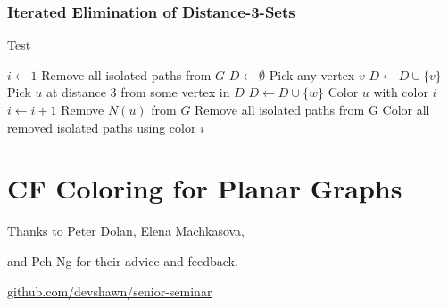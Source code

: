 \documentclass[xcolor=dvipsnames,aspectratio=1610]{beamer}
\begin{document}
  \begin{frame}
    \frametitle{Iterated Elimination of Distance-3-Sets}

    \begin{algorithm}[H]
    \caption{Test}
    \scriptsize
    \begin{algorithmic}[1]
    \State $i \gets 1$
    \State Remove all isolated paths from $G$
    	\State $D \gets \emptyset$
    		\State Pick any vertex $v$
    		\State $D \gets D \cup \{ v \}$
    			\State Pick $u$ at distance 3 from some vertex in $D$
    			\State $D \gets D \cup \{ w \}$
    		\EndWhile
    			\State Color $u$ with color $i$
    		\EndFor
    		\State $i \gets i + 1$
    			\State Remove $N(u)$ from $G$
    		\EndFor
    		\State Remove all isolated paths from G
    	\EndFor
    \EndWhile
    \State Color all removed isolated paths using color $i$
    \end{algorithmic}
  \end{algorithm}
  \end{frame}


  \section{CF Coloring for Planar Graphs}

  \begin{frame}[standout]
    \centering
    {Thanks to Peter Dolan, Elena Machkasova,

    and Peh Ng for their advice and feedback.}
    \vfill
    \href{https://github.com/devshawn/senior-seminar}{github.com/devshawn/senior-seminar}
    \vfill
    \ccbyncsa{}
  \end{frame}
\end{document}
